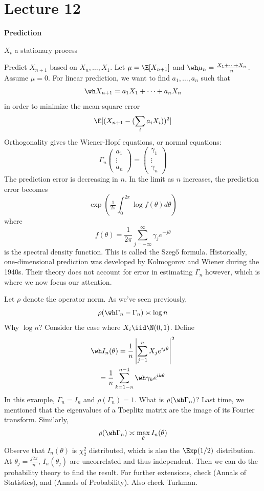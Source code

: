 \section{Lecture 12}

\textbf{Prediction}

\(X_t\) a stationary process

Predict \(X_{n+1}\) based on \(X_n, \dots, X_1\). Let \(\mu = \E[X_{n+1}]\) and \(\wh \mu_n = \frac{X_1 + \cdots + X_n}{n}\). Assume \(\mu = 0\). For linear prediction, we want to find \(a_1, \dots, a_n\) such that
\[\wh X_{n+1} = a_1 X_1 + \cdots + a_n X_n\]
in order to minimize the mean-square error
\[\E[(X_{n+1} - (\sum_i a_i X_i))^2]\]
Orthogonality gives the Wiener-Hopf equations, or normal equations:
\[\Gamma_n
\begin{pmatrix}
a_1 \\
\vdots \\
a_n
\end{pmatrix}
=
\begin{pmatrix}
\gamma_1 \\
\vdots \\
\gamma_n
\end{pmatrix}\]
The prediction error is decreasing in \(n\). In the limit as \(n\) increases, the prediction error becomes
\[\exp\left(\tfrac{1}{2\pi} \int_0^{2\pi} \log f(\theta)d\theta\right)\]
where
\[f(\theta) = \frac{1}{2\pi} \sum_{j=-\infty}^\infty \gamma_j e^{-j\theta}\]
is the spectral density function. This is called the Szeg\H{o} formula. Historically, one-dimensional prediction was developed by Kolmogorov and Wiener during the 1940s. Their theory does not account for error in estimating \(\Gamma_n\) however, which is where we now focus our attention.

Let \(\rho\) denote the operator norm. As we've seen previously,
\[\rho(\wh \Gamma_n - \Gamma_n) \asymp \log n\]
Why \(\log n\)? Consider the case where \(X_i \iid \N(0, 1)\). Define
\[\begin{gathered}\wh I_n(\theta) = \frac{1}{n} \left| \sum_{j=1}^n X_j e^{ij\theta} \right|^2 \\
= \frac{1}{n} \sum_{k=1-n}^{n-1} \wh \gamma_k e^{ik\theta}\end{gathered}\]
In this example, \(\Gamma_n = I_n\) and \(\rho(\Gamma_n) = 1\). What is \(\rho(\wh \Gamma_n)\)? Last time, we mentioned that the eigenvalues of a Toeplitz matrix are the image of its Fourier transform. Similarly,
\[\rho(\wh \Gamma_n) \asymp \max_\theta I_n(\theta)\]
Observe that \(I_n(\theta)\) is \(\chi^2_2\) distributed, which is also the \(\Exp(1/2)\) distribution. At \(\theta_j = \frac{j 2 \pi }{n}\), \(I_n(\theta_j)\) are uncorrelated and thus independent. Then we can do the probability theory to find the result. For further extensions, check \citet{LL09} (Annals of Statistics), and \citet{PW10} (Annals of Probability). Also check Turkman.

